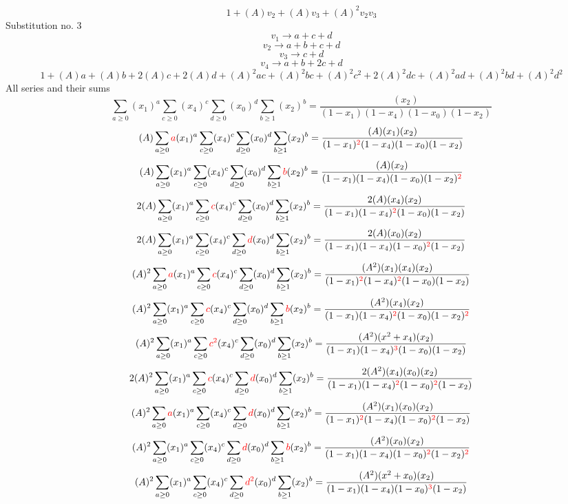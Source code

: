 \documentclass{article}
\begin{document}
\[1+(A)v_2+(A)v_3+(A)^2v_2v_3\]Substitution no. 3\[v_1\rightarrow{a+c+d}\]\[v_2\rightarrow{a+b+c+d}\]\[v_3\rightarrow{c+d}\]\[v_4\rightarrow{a+b+2c+d}\]\[1+(A)a+(A)b+2(A)c+2(A)d+(A)^2ac+(A)^2bc+(A)^2c^{2}+2(A)^2dc+(A)^2ad+(A)^2bd+(A)^2d^{2}\]All series and their sums\[\sum_{a\geq{0}}(x_1)^{a}\sum_{c\geq{0}}(x_4)^{c}\sum_{d\geq{0}}(x_0)^{d}\sum_{b\geq{1}}(x_2)^{b}=\frac{(x_2)}{(1-x_1)(1-x_4)(1-x_0)(1-x_2)}\]\[(A)\sum_{a\geq{0}}\textcolor{red}{a}(x_1)^{a}\sum_{c\geq{0}}(x_4)^{c}\sum_{d\geq{0}}(x_0)^{d}\sum_{b\geq{1}}(x_2)^{b}=\frac{(A)(x_1)(x_2)}{(1-x_1)^{\textcolor{red}{2}}(1-x_4)(1-x_0)(1-x_2)}\]\[(A)\sum_{a\geq{0}}(x_1)^{a}\sum_{c\geq{0}}(x_4)^{c}\sum_{d\geq{0}}(x_0)^{d}\sum_{b\geq{1}}\textcolor{red}{b}(x_2)^{b}=\frac{(A)(x_2)}{(1-x_1)(1-x_4)(1-x_0)(1-x_2)^{\textcolor{red}{2}}}\]\[2(A)\sum_{a\geq{0}}(x_1)^{a}\sum_{c\geq{0}}\textcolor{red}{c}(x_4)^{c}\sum_{d\geq{0}}(x_0)^{d}\sum_{b\geq{1}}(x_2)^{b}=\frac{2(A)(x_4)(x_2)}{(1-x_1)(1-x_4)^{\textcolor{red}{2}}(1-x_0)(1-x_2)}\]\[2(A)\sum_{a\geq{0}}(x_1)^{a}\sum_{c\geq{0}}(x_4)^{c}\sum_{d\geq{0}}\textcolor{red}{d}(x_0)^{d}\sum_{b\geq{1}}(x_2)^{b}=\frac{2(A)(x_0)(x_2)}{(1-x_1)(1-x_4)(1-x_0)^{\textcolor{red}{2}}(1-x_2)}\]\[(A)^{2}\sum_{a\geq{0}}\textcolor{red}{a}(x_1)^{a}\sum_{c\geq{0}}\textcolor{red}{c}(x_4)^{c}\sum_{d\geq{0}}(x_0)^{d}\sum_{b\geq{1}}(x_2)^{b}=\frac{(A^{2})(x_1)(x_4)(x_2)}{(1-x_1)^{\textcolor{red}{2}}(1-x_4)^{\textcolor{red}{2}}(1-x_0)(1-x_2)}\]\[(A)^{2}\sum_{a\geq{0}}(x_1)^{a}\sum_{c\geq{0}}\textcolor{red}{c}(x_4)^{c}\sum_{d\geq{0}}(x_0)^{d}\sum_{b\geq{1}}\textcolor{red}{b}(x_2)^{b}=\frac{(A^{2})(x_4)(x_2)}{(1-x_1)(1-x_4)^{\textcolor{red}{2}}(1-x_0)(1-x_2)^{\textcolor{red}{2}}}\]\[(A)^{2}\sum_{a\geq{0}}(x_1)^{a}\sum_{c\geq{0}}\textcolor{red}{c^{2}}(x_4)^{c}\sum_{d\geq{0}}(x_0)^{d}\sum_{b\geq{1}}(x_2)^{b}=\frac{(A^{2})(x^{2}+x_4)(x_2)}{(1-x_1)(1-x_4)^{\textcolor{red}{3}}(1-x_0)(1-x_2)}\]\[2(A)^{2}\sum_{a\geq{0}}(x_1)^{a}\sum_{c\geq{0}}\textcolor{red}{c}(x_4)^{c}\sum_{d\geq{0}}\textcolor{red}{d}(x_0)^{d}\sum_{b\geq{1}}(x_2)^{b}=\frac{2(A^{2})(x_4)(x_0)(x_2)}{(1-x_1)(1-x_4)^{\textcolor{red}{2}}(1-x_0)^{\textcolor{red}{2}}(1-x_2)}\]\[(A)^{2}\sum_{a\geq{0}}\textcolor{red}{a}(x_1)^{a}\sum_{c\geq{0}}(x_4)^{c}\sum_{d\geq{0}}\textcolor{red}{d}(x_0)^{d}\sum_{b\geq{1}}(x_2)^{b}=\frac{(A^{2})(x_1)(x_0)(x_2)}{(1-x_1)^{\textcolor{red}{2}}(1-x_4)(1-x_0)^{\textcolor{red}{2}}(1-x_2)}\]\[(A)^{2}\sum_{a\geq{0}}(x_1)^{a}\sum_{c\geq{0}}(x_4)^{c}\sum_{d\geq{0}}\textcolor{red}{d}(x_0)^{d}\sum_{b\geq{1}}\textcolor{red}{b}(x_2)^{b}=\frac{(A^{2})(x_0)(x_2)}{(1-x_1)(1-x_4)(1-x_0)^{\textcolor{red}{2}}(1-x_2)^{\textcolor{red}{2}}}\]\[(A)^{2}\sum_{a\geq{0}}(x_1)^{a}\sum_{c\geq{0}}(x_4)^{c}\sum_{d\geq{0}}\textcolor{red}{d^{2}}(x_0)^{d}\sum_{b\geq{1}}(x_2)^{b}=\frac{(A^{2})(x^{2}+x_0)(x_2)}{(1-x_1)(1-x_4)(1-x_0)^{\textcolor{red}{3}}(1-x_2)}\]
\end{document}
